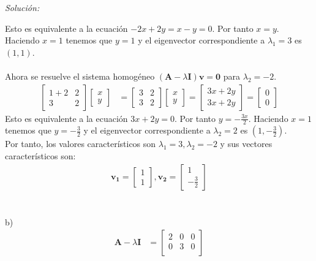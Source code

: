 \documentclass[12pt]{article}
\newenvironment{sol}
    {\emph{Solución:}
    }
    {
    }
\begin{document}
\begin{sol}
Esto es equivalente a la ecuación $-2x+2y=x-y=0$. Por tanto $x=y$. Haciendo $x=1$ tenemos que $y=1$ y el eigenvector correspondiente a $\lambda_1=3$ es $(1,1)$.\\\\
Ahora se resuelve el sistema homogéneo $(\mathbf{A}-\lambda\mathbf{I})\mathbf{v}=\mathbf{0}$ para $\lambda_2=-2$.
\begin{align*}
\begin{bmatrix}
1+2 & 2 \\
3 & 2
\end{bmatrix}
\begin{bmatrix}
x\\y
\end{bmatrix}
&= 
\begin{bmatrix}
3 & 2 \\
3 & 2
\end{bmatrix}
\begin{bmatrix}
x\\y
\end{bmatrix} =
\begin{bmatrix}
3x+2y\\3x+2y
\end{bmatrix}=
\begin{bmatrix}
0\\0
\end{bmatrix}
\end{align*}
Esto es equivalente a la ecuación $3x+2y=0$. Por tanto $y=-\frac{3x}{2}$. Haciendo $x=1$ tenemos que $y=-\frac{3}{2}$ y el eigenvector correspondiente a $\lambda_2=2$ es $(1,-\frac{3}{2})$.\\
Por tanto, los valores característicos son $\lambda_1=3,\lambda_2=-2$ y sus vectores característicos son:
\begin{align*}\mathbf{v_1}=
\begin{bmatrix}
1\\1
\end{bmatrix},\mathbf{v_2}=
\begin{bmatrix}
1 \\ -\frac{3}{2}
\end{bmatrix}
\end{align*} \\ \\
b)\\
\begin{align*}
\mathbf{A}-\lambda\mathbf{I} &= 
\begin{bmatrix}
2 & 0 & 0\\
0 & 3 & 0 \\

\end{bmatrix}
\end{align*}
\end{sol}
\end{document}
